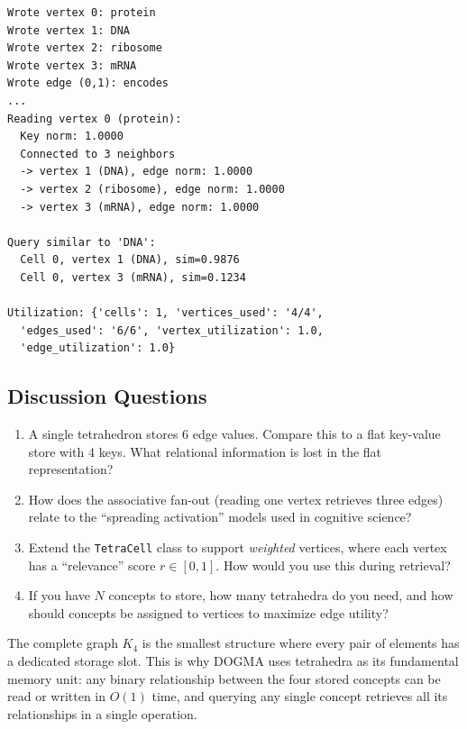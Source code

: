 \begin{lstlisting}[style=dogmapython, caption={Lab 4: Expected output (abbreviated).}, numbers=none]
Wrote vertex 0: protein
Wrote vertex 1: DNA
Wrote vertex 2: ribosome
Wrote vertex 3: mRNA
Wrote edge (0,1): encodes
...
Reading vertex 0 (protein):
  Key norm: 1.0000
  Connected to 3 neighbors
  -> vertex 1 (DNA), edge norm: 1.0000
  -> vertex 2 (ribosome), edge norm: 1.0000
  -> vertex 3 (mRNA), edge norm: 1.0000

Query similar to 'DNA':
  Cell 0, vertex 1 (DNA), sim=0.9876
  Cell 0, vertex 3 (mRNA), sim=0.1234

Utilization: {'cells': 1, 'vertices_used': '4/4',
  'edges_used': '6/6', 'vertex_utilization': 1.0,
  'edge_utilization': 1.0}
\end{lstlisting}

\subsection{Discussion Questions}

\begin{enumerate}[leftmargin=1.8em]
  \item A single tetrahedron stores 6 edge values. Compare this to a flat key-value store with 4 keys. What relational information is lost in the flat representation?
  \item How does the associative fan-out (reading one vertex retrieves three edges) relate to the ``spreading activation'' models used in cognitive science?
  \item Extend the \texttt{TetraCell} class to support \emph{weighted} vertices, where each vertex has a ``relevance'' score $r \in [0, 1]$. How would you use this during retrieval?
  \item If you have $N$ concepts to store, how many tetrahedra do you need, and how should concepts be assigned to vertices to maximize edge utility?
\end{enumerate}

\begin{keyinsight}
The complete graph $K_4$ is the smallest structure where every pair of elements has a dedicated storage slot. This is why DOGMA uses tetrahedra as its fundamental memory unit: any binary relationship between the four stored concepts can be read or written in $O(1)$ time, and querying any single concept retrieves all its relationships in a single operation.
\end{keyinsight}


